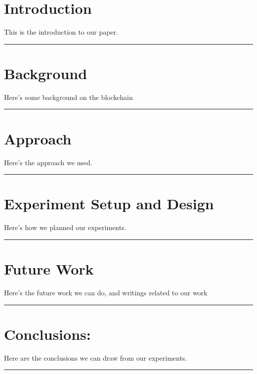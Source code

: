 \documentclass{article}
\newcommand{\HRule}{\rule{\linewidth}{0.5mm}}
\begin{document}
\section{Introduction}

This is the introduction to our paper.

\HRule

\section{Background}

Here's some background on the blockchain

\HRule

\section{Approach}

Here's the approach we used.

\HRule

\section{Experiment Setup and Design}

Here's how we planned our experiments.

\HRule

\section{Future Work}

Here's the future work we can do, and writings related to our work

\HRule

\section{Conclusions:}

Here are the conclusions we can draw from our experiments.

\HRule
\end{document}
